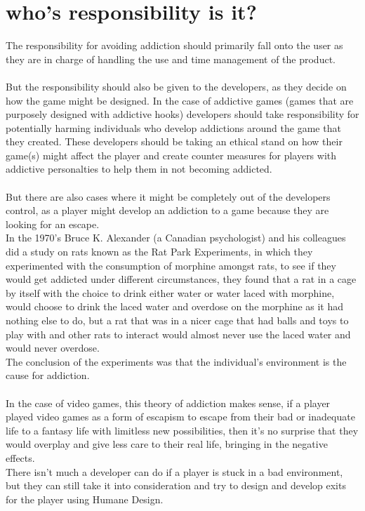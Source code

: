 \documentclass{scrartcl}
\begin{document}
\section{who's responsibility is it?}
The responsibility for avoiding addiction should primarily fall onto the user as they are in charge of handling the use and time management of the product.
\\
\\
But the responsibility should also be given to the developers, as they decide on how the game might be designed. In the case of addictive games (games that are purposely designed with addictive hooks) developers should take responsibility for potentially harming individuals who develop addictions around the game that they created. These developers should be taking an ethical stand on how their game(s) might affect the player and create counter measures for players with addictive personalties to help them in not becoming addicted.
\\
\\
But there are also cases where it might be completely out of the developers control, as a player might develop an addiction to a game because they are looking for an escape.
\\
In the 1970's Bruce K. Alexander (a Canadian psychologist) and his colleagues did a study on rats known as the Rat Park Experiments, in which they experimented with the consumption of morphine amongst rats, to see if they would get addicted under different circumstances, they found that a rat in a cage by itself with the choice to drink either water or water laced with morphine, would choose to drink the laced water and overdose on the morphine as it had nothing else to do, but a rat that was in a nicer cage that had balls and toys to play with and other rats to interact would almost never use the laced water and would never overdose.\cite{RatPark1, RatPark2}
\\
The conclusion of the experiments was that the individual's environment is the cause for addiction.
\\
\\
In the case of video games, this theory of addiction makes sense, if a player played video games as a form of escapism to escape from their bad or inadequate life to a fantasy life with limitless new possibilities, then it's no surprise that they would overplay and give less care to their real life, bringing in the negative effects.
\\
There isn't much a developer can do if a player is stuck in a bad environment, but they can still take it into consideration and try to design and develop exits for the player using Humane Design.\cite{ExitPoints}
\end{document}
